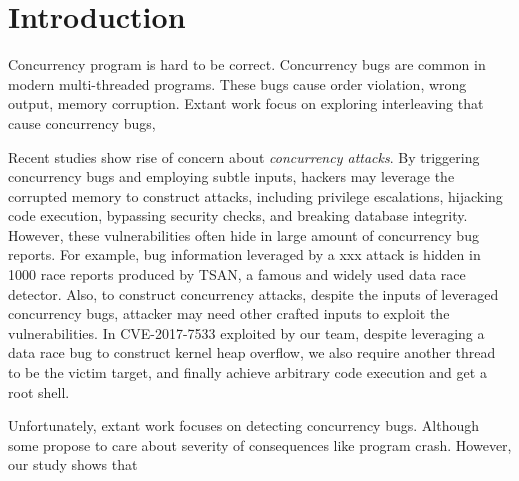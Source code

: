 \section{Introduction} \label{sec:intro}


Concurrency program is hard to be correct. 
Concurrency bugs are common in modern multi-threaded programs\cite{conmem:asplos10,conseq:asplos11}. 
These bugs cause order violation, wrong output, memory corruption.
Extant work focus on exploring interleaving that cause concurrency bugs, 

Recent studies\cite{acidrain:sigmod17,con:hotpar12} show rise of concern about \emph{concurrency attacks}.
By triggering concurrency bugs and employing subtle inputs, 
hackers may leverage the corrupted memory to construct 
attacks, including privilege escalations\cite{}, hijacking code execution\cite{}, bypassing security checks\cite{}, 
and breaking database integrity\cite{acidrain:sigmod17}.
However, these vulnerabilities often hide in large amount of concurrency bug reports. 
For example, bug information leveraged by a xxx attack is hidden in 1000 race reports 
produced by TSAN\cite{tsan}, a famous and widely used data race detector. 
Also, to construct concurrency attacks, despite the inputs of leveraged concurrency bugs, 
attacker may need other crafted inputs to exploit the vulnerabilities. 
In CVE-2017-7533 exploited by our team, 
despite leveraging a data race bug to construct kernel heap overflow, 
we also require another thread to be the victim target, 
and finally achieve arbitrary code execution and get a root shell.   



Unfortunately, extant work\cite{tsan,conseq:asplos11} focuses on detecting concurrency bugs. 
Although some \cite{conmem:asplos10} propose to care about severity of consequences like program crash.
However, our study shows that 














